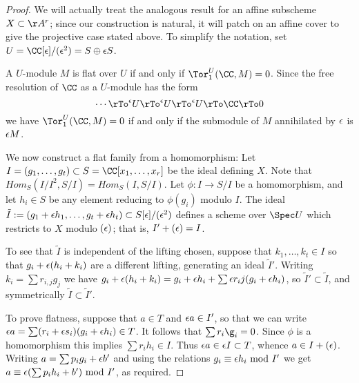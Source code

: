 \begin{proof}
We will actually treat the analogous result for an affine subscheme $X \subset \AA^r$; since our construction is natural, it will patch on an affine cover to give the projective case stated above. To simplify the notation, set $U = \CC[\eps]/(\eps^2)= S \oplus \eps S$. 

A $U$-module $M$ is flat  over $U$ if and only if $\Tor_1^U(\CC,M) = 0$. 
Since the free resolution of $\CC$ as a $U$-module has the form
$$
\cdots \rTo^\eps U \rTo^\eps U \rTo^\eps U \rTo \CC \rTo 0
$$
we have $\Tor_1^U(\CC,M)=0$ if and only if the submodule of $M$ annihilated by $\eps$ is $\eps M$.


We now construct a flat family from a homomorphism: Let $I = (g_1,\dots, g_t)\subset S = \CC[x_1,\dots, x_r]$ be the ideal defining $X$. 
Note that $Hom_S(I/I^2, S/I) = Hom_S(I,S/I)$. Let $\phi: I\to S/I$ be a homomorphism, and let $h_i\in S$ be
any element reducing to $\phi(g_i)$ modulo $I$.  The ideal
$\tilde I := (g_1+\eps h_1,\dots, g_t+\eps h_t)\subset S[\eps]/(\eps^2)$
defines a scheme over $\Spec U$ which restricts to $X$ modulo $(\eps)$; that is, $I' +(\eps) = I$. 

To see that $\tilde I$ is 
independent of the lifting chosen, suppose that $k_1,\dots,k_t\in I$ so that $g_i+\eps(h_i+k_i)$ are a different lifting,
generating an ideal $\tilde I'$.
Writing $k_i = \sum r_{i,j}g_j$ we have $g_i+\eps(h_i+k_i) = g_i+\eps h_i+ \sum \eps r_ij(g_i+\eps h_i)$, so 
$\tilde I' \subset \tilde I$, and symmetrically $\tilde I \subset \tilde I'$.

To prove flatness, suppose that $a\in T$ and  $\eps a  \in I'$,
so that we can write  $\eps a= \sum(r_i+\eps s_i)(g_i+\eps h_i) \in T$.
It follows that 
$\sum r_i\g_i = 0$. Since $\phi$ is a homomorphism this implies $\sum r_i h_i \in I.$ Thus
$\eps a \in  \eps I\subset T$, whence $a\in I + (\eps)$.  Writing $a =\sum p_i g_i+\eps b'$
and using the relations $g_i \equiv \eps h_i \hbox{ mod } I'$ we get
 $a \equiv \eps (\sum p_i h_i+b') \hbox{ mod } I'$, as required.


\end{proof}
